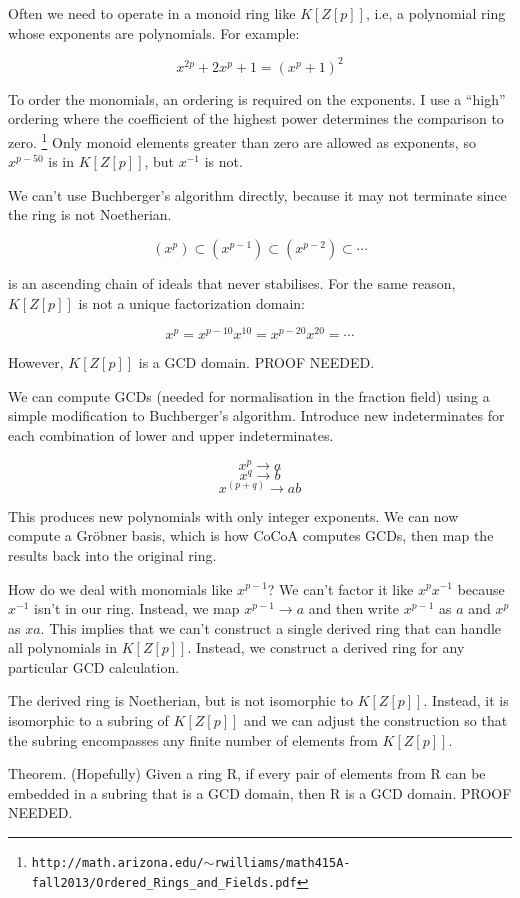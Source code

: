 \documentclass{article}
\begin{document}
Often we need to operate in a monoid ring like $K[Z[p]]$, i.e, a
polynomial ring whose exponents are polynomials.  For example:

$$x^{2p}+2x^p+1=(x^p+1)^2$$

To order the monomials, an ordering is required on the exponents.  I use a ``high''
ordering where the coefficient of the highest power determines the comparison to zero.
\footnote{\tt http://math.arizona.edu/$\sim$rwilliams/math415A-fall2013/Ordered\_Rings\_and\_Fields.pdf}
Only monoid elements greater than zero are allowed as exponents, so $x^{p-50}$ is
in $K[Z[p]]$, but $x^{-1}$ is not.

We can't use Buchberger's algorithm directly, because it may not terminate since
the ring is not Noetherian.

$$(x^p) \subset (x^{p-1}) \subset (x^{p-2}) \subset \cdots$$

is an ascending chain of ideals that never stabilises.
For the same reason, $K[Z[p]]$ is not a unique factorization domain:

$$x^p = x^{p-10}x^{10} = x^{p-20}x^{20} = \cdots$$

However, $K[Z[p]]$ is a GCD domain.  PROOF NEEDED.

We can compute GCDs (needed for normalisation in the fraction field) using a
simple modification to Buchberger's algorithm.  Introduce new indeterminates
for each combination of lower and upper indeterminates.

$$x^p  \to  a$$
$$x^q  \to  b$$
$$x^{(p+q)} \to ab$$

This produces new polynomials with only integer exponents.  We can now
compute a Gr\"obner basis, which is how CoCoA computes GCDs, then map
the results back into the original ring.

How do we deal with monomials like $x^{p-1}$?  We can't factor it like
$x^px^{-1}$ because $x^{-1}$ isn't in our ring.  Instead, we map
$x^{p-1} \to a$ and then write $x^{p-1}$ as $a$ and $x^p$ as $xa$.
This implies that we can't construct a single derived ring that can
handle all polynomials in $K[Z[p]]$.  Instead, we construct a
derived ring for any particular GCD calculation.

The derived ring is Noetherian, but is not isomorphic to $K[Z[p]]$.
Instead, it is isomorphic to a subring of $K[Z[p]]$ and we can adjust
the construction so that the subring encompasses any finite number of
elements from $K[Z[p]]$.

Theorem.  (Hopefully) Given a ring R, if every pair of elements from R can be
embedded in a subring that is a GCD domain, then R is a GCD domain.
PROOF NEEDED.
\end{document}
